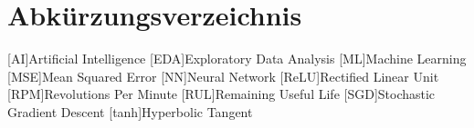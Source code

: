 \chapter*{Abkürzungsverzeichnis} 

\begin{acronym}
	
	[AI]{Artificial Intelligence}
	[EDA]{Exploratory Data Analysis}
	[ML]{Machine Learning}
	[MSE]{Mean Squared Error}
	[NN]{Neural Network}
	[ReLU]{Rectified Linear Unit}
	[RPM]{Revolutions Per Minute}
	[RUL]{Remaining Useful Life}
	[SGD]{Stochastic Gradient Descent}
	[tanh]{Hyperbolic Tangent}
	
\end{acronym}
